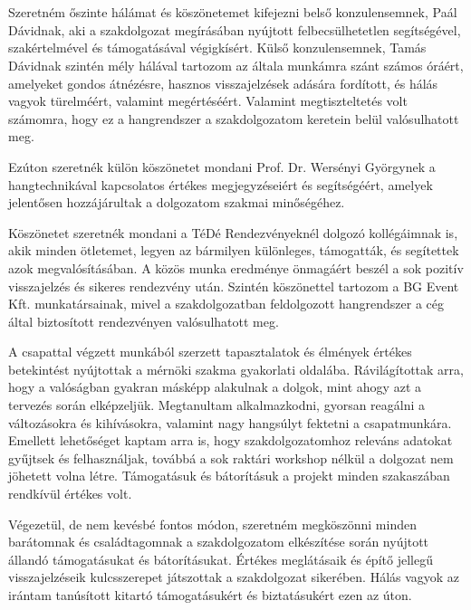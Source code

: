 \chapter*{\koszonetnyilvanitas}
Szeretném őszinte hálámat és köszönetemet kifejezni belső konzulensemnek, Paál Dávidnak, aki a szakdolgozat
megírásában nyújtott felbecsülhetetlen segítségével, szakértelmével és támogatásával végigkísért.
Külső konzulensemnek, Tamás Dávidnak szintén mély hálával tartozom az általa munkámra szánt számos óráért, 
amelyeket gondos átnézésre, hasznos visszajelzések adására fordított, és hálás vagyok türelméért, valamint megértéséért. Valamint
megtiszteltetés volt számomra, hogy ez a hangrendszer a szakdolgozatom keretein belül valósulhatott meg.

Ezúton szeretnék külön köszönetet mondani Prof. Dr. Wersényi Györgynek 
a hangtechnikával kapcsolatos értékes megjegyzéseiért és segítségéért, amelyek jelentősen hozzájárultak a dolgozatom szakmai minőségéhez.

Köszönetet szeretnék mondani a TéDé Rendezvényeknél dolgozó kollégáimnak is, akik minden ötletemet, 
legyen az bármilyen különleges, támogatták, és segítettek azok megvalósításában. A közös munka eredménye önmagáért beszél
a sok pozitív visszajelzés és sikeres rendezvény után. Szintén köszönettel tartozom a BG Event Kft. munkatársainak,
mivel a szakdolgozatban feldolgozott hangrendszer a cég által biztosított rendezvényen valósulhatott meg.

A csapattal végzett munkából szerzett tapasztalatok és élmények értékes betekintést nyújtottak a mérnöki 
szakma gyakorlati oldalába. Rávilágítottak arra, hogy a valóságban gyakran másképp alakulnak a dolgok, mint ahogy azt a tervezés során elképzeljük. 
Megtanultam alkalmazkodni, gyorsan reagálni a változásokra és kihívásokra, valamint nagy hangsúlyt fektetni a csapatmunkára. 
Emellett lehetőséget kaptam arra is, hogy szakdolgozatomhoz releváns adatokat gyűjtsek és felhasználjak, 
továbbá a sok raktári workshop nélkül a dolgozat nem jöhetett volna létre. 
Támogatásuk és bátorításuk a projekt minden szakaszában rendkívül értékes volt.

Végezetül, de nem kevésbé fontos módon, szeretném megköszönni minden barátomnak és 
családtagomnak a szakdolgozatom elkészítése során nyújtott állandó támogatásukat és bátorításukat. 
Értékes meglátásaik és építő jellegű visszajelzéseik kulcsszerepet játszottak a szakdolgozat sikerében. 
Hálás vagyok az irántam tanúsított kitartó támogatásukért és biztatásukért ezen az úton.